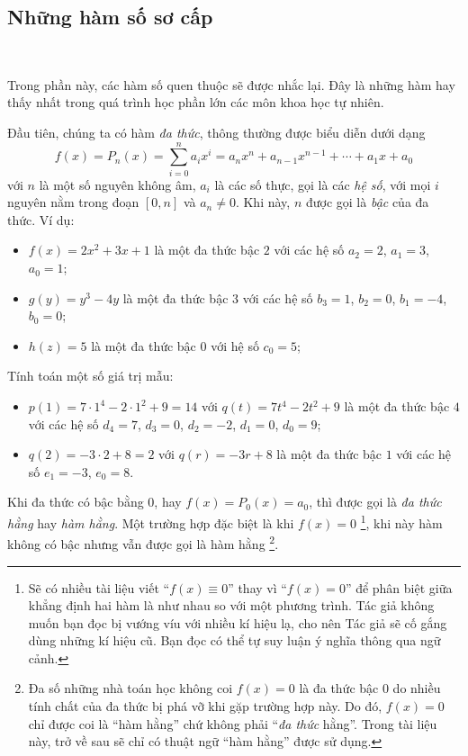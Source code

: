 \documentclass[a4paper, titlepage, openany]{book}
\newcounter{exercise}
\newcounter{solution}
\newcommand\dblquote[1]{\textquotedblleft #1\textquotedblright}
\begin{document}
\exercise


\solution

\subsection{Những hàm số sơ cấp}

\ %

Trong phần này, các hàm số quen thuộc sẽ được nhắc lại. Đây là những hàm hay thấy nhất trong quá trình học phần lớn các môn khoa học tự nhiên.

Đầu tiên, chúng ta có hàm \emph{đa thức}, thông thường được biểu diễn dưới dạng $$f(x)=P_n(x)=\sum_{i = 0}^n a_i x^i = a_nx^n + a_{n-1}x^{n-1} + \cdots + a_1x + a_0$$ với $n$ là một số nguyên không âm, $a_i$ là các số thực, gọi là các \emph{hệ số}, với mọi $i$ nguyên nằm trong đoạn $[0, n]$ và $a_n \neq 0$. Khi này, $n$ được gọi là \emph{bậc} của đa thức. Ví dụ:
\begin{itemize}
   \item $f(x) = 2x^2 + 3x + 1$ là một đa thức bậc $2$ với các hệ số $a_2 = 2$, $a_1 = 3$, $a_0 = 1$;
   \item $g(y) = y^3 - 4y$ là một đa thức bậc $3$ với các hệ số $b_3 = 1$, $b_2 = 0$, $b_1 = -4$, $b_0 = 0$;
   \item $h(z) = 5$ là một đa thức bậc $0$ với hệ số $c_0 = 5$;
\end{itemize}
Tính toán một số giá trị mẫu:
\begin{itemize}
   \item $p(1) = 7 \cdot 1^4 - 2 \cdot 1^2 + 9 = 14$ với $q(t)= 7t^4 - 2t^2 + 9$ là một đa thức bậc $4$ với các hệ số $d_4 = 7$, $d_3 = 0$, $d_2 = -2$, $d_1 = 0$, $d_0 = 9$;
   \item $q(2) = -3 \cdot 2 + 8 = 2$ với $q(r) = -3r + 8$ là một đa thức bậc $1$ với các hệ số $e_1 = -3$, $e_0 = 8$.
\end{itemize}
Khi đa thức có bậc bằng $0$, hay $f(x) = P_0(x) = a_0$, thì được gọi là \emph{đa thức hằng} hay \emph{hàm hằng}. Một trường hợp đặc biệt là khi $f(x) = 0$ \footnote{Sẽ có nhiều tài liệu viết \dblquote{$f(x) \equiv 0$} thay vì \dblquote{$f(x) = 0$} để phân biệt giữa khẳng định hai hàm là như nhau so với một phương trình. Tác giả không muốn bạn đọc bị vướng víu với nhiều kí hiệu lạ, cho nên Tác giả sẽ cố gắng dùng những kí hiệu cũ. Bạn đọc có thể tự suy luận ý nghĩa thông qua ngữ cảnh.}, khi này hàm không có bậc nhưng vẫn được gọi là hàm hằng \footnote{Đa số những nhà toán học không coi $f(x) = 0$ là đa thức bậc $0$ do nhiều tính chất của đa thức bị phá vỡ khi gặp trường hợp này. Do đó, $f(x) = 0$ chỉ được coi là \dblquote{hàm hằng} chứ không phải \dblquote{\textit{đa thức} hằng}. Trong tài liệu này, trở về sau sẽ chỉ có thuật ngữ \dblquote{hàm hằng} được sử dụng.}.
\end{document}
